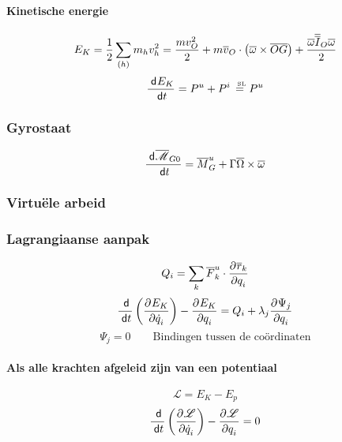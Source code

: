 \paragraph{Kinetische energie}
\[
  E_K = \frac{1}{2}\sum_{(h)} m_h v_h^2
      = \frac{mv_O^2}{2} + m\overline{v}_O \cdot \left( \overline{\omega} \times \overline{OG} \right) + \frac{\overline{\omega} \overline{\overline{I}}_O \overline{\omega}}{2}
\]
\[
  \frac{\;\textsf{d}^{}{E_K}}{\;\textsf{d}t^{}} = P^u + P^i \stackrel{\mbox{ \tiny SL}}{=} P^u
\]

\subsubsection{Gyrostaat}
\[
  \frac{\;\textsf{d}^{}{\overline{\mathscr{M}}_{G0}}}{\;\textsf{d}t^{}} = \overline{M}_G^u + \Gamma \overline{\Omega} \times \overline{\omega}
\]


\subsubsection{Virtuële arbeid}

\subsubsection{Lagrangiaanse aanpak}
\[
  Q_i = \sum_k \overline{F}_k^u \cdot \frac{\partial ^{}{\overline{r}_k}}{\partial q_i^{}}
\]
\[
  \frac{\;\textsf{d}^{}{}}{\;\textsf{d}t^{}} \left( \frac{\partial ^{}{E_K}}{\partial \dot{q}_i^{}} \right) - \frac{\partial ^{}{E_K}}{\partial q_i^{}} = Q_i + \lambda_j \frac{\partial ^{}{\Psi_j}}{\partial q_i^{}}
\]
\[
  \Psi_j = 0 \qquad \mbox{Bindingen tussen de coördinaten}
\]
\paragraph{Als alle krachten afgeleid zijn van een potentiaal}
\[
  \mathscr{L} = E_K - E_p
\]
\[
  \frac{\;\textsf{d}^{}{}}{\;\textsf{d}t^{}} \left( \frac{\partial ^{}{\mathscr{L}}}{\partial \dot{q}_i^{}} \right) - \frac{\partial ^{}{\mathscr{L}}}{\partial q_i^{}} = 0
\]



